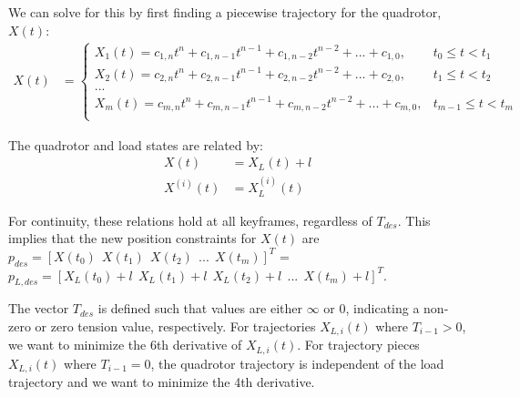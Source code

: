 \documentclass[11pt]{article}
\begin{document}
We can solve for this by first finding a piecewise trajectory for the quadrotor, $X(t)$:
\begin{align*}
X(t) &= 
\begin{cases}
    X_{1} (t) = c_{1, n} t^n + c_{1, n-1} t^{n-1} + c_{1, n-2} t^{n-2} + ... + c_{1, 0}, & t_0 \le t < t_1 \\
    X_{2} (t) = c_{2, n} t^n + c_{2, n-1} t^{n-1} + c_{2, n-2} t^{n-2} + ... + c_{2, 0}, & t_1 \le t < t_2 \\
    ... \\
    X_{m} (t) = c_{m, n} t^n + c_{m, n-1} t^{n-1} + c_{m, n-2} t^{n-2} + ... + c_{m, 0}, & t_{m-1} \le t < t_m \\
\end{cases}
\end{align*}

The quadrotor and load states are related by:
\begin{align*}
X(t) &= X_{L}(t)+l \\
X^{(i)}(t) &= X^{(i)}_L (t) 
\end{align*}

For continuity, these relations hold at all keyframes, regardless of $T_{des}$. This implies that the new position constraints for $X(t)$ are $p_{des} = [X(t_0) \ \ X(t_1) \ \ X(t_2) \ \ ... \ \ X(t_m)]^T$ = $p_{L, des} = [X_L(t_0)+l \ \ X_L(t_1)+l \ \ X_L(t_2)+l \ \ ... \ \ X(t_m)+l]^T$. 

\mbox{}\newline
The vector $T_{des}$ is defined such that values are either $\infty$ or $0$, indicating a non-zero or zero tension value, respectively.  For trajectories $X_{L, i}(t)$ where $T_{i-1} > 0$, we want to minimize the 6th derivative of $X_{L, i}(t)$. For trajectory pieces $X_{L, i}(t)$ where $T_{i-1} = 0$, the quadrotor trajectory is independent of the load trajectory and we want to minimize the 4th derivative. 
\end{document}
